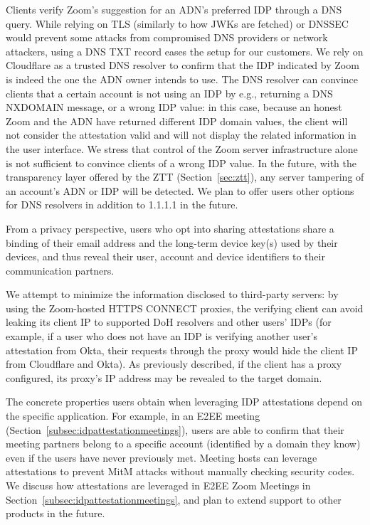 Clients verify Zoom's suggestion for an ADN's preferred IDP through a DNS 
query. While relying on TLS (similarly to how JWKs are fetched) or DNSSEC 
would prevent some attacks from compromised DNS providers or network 
attackers, using a DNS TXT record eases the setup for our customers. We
rely on Cloudflare as a trusted DNS resolver to confirm that the IDP indicated
by Zoom is indeed the one the ADN owner intends to use. The DNS resolver can
convince clients that a certain account is not using an IDP by e.g., returning a
DNS NXDOMAIN message, or a wrong IDP value: in this case, because an honest Zoom
and the ADN have returned different IDP domain values, the client will not
consider the attestation valid and will not display the related information in
the user interface. We stress that control of the Zoom server infrastructure
alone is not sufficient to convince clients of a wrong IDP value. In the future, with the
transparency layer offered by the ZTT (Section~\ref{sec:ztt}), any server
tampering of an account’s ADN or IDP will be detected. We plan to offer users
other options for DNS resolvers in addition to 1.1.1.1 in the future.

From a privacy perspective, users who opt into sharing attestations share a
binding of their email address and the long-term device key(s) used by their
devices, and thus reveal their user, account and device identifiers to their
communication partners. 

We attempt to minimize the information disclosed to third-party servers: by
using the Zoom-hosted HTTPS CONNECT proxies, the verifying client can avoid
leaking its client IP to supported DoH resolvers and other users' IDPs (for
example, if a user who does not have an IDP is verifying another user's
attestation from Okta, their requests through the proxy would hide the client IP
from Cloudflare and Okta). As previously described, if the client has a proxy configured, 
its proxy's IP address may be revealed to the target domain.

The concrete properties users obtain when leveraging IDP attestations depend on the specific
application. For example, in an E2EE meeting (Section~\ref{subsec:idpattestationmeetings}), users
are able to confirm that their meeting partners belong to a specific account (identified by a domain
they know) even if the users have never previously met. Meeting hosts can leverage attestations to
prevent MitM attacks without manually checking security codes. We discuss how attestations are
leveraged in E2EE Zoom Meetings in Section~\ref{subsec:idpattestationmeetings}, and plan to extend
support to other products in the future.
